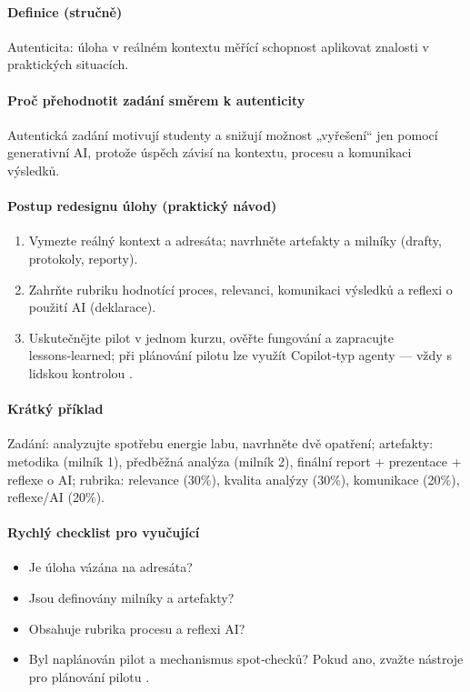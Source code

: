 \paragraph{Definice (stručně)} 
Autenticita: úloha v reálném kontextu měřící schopnost aplikovat znalosti v praktických situacích.

\paragraph{Proč přehodnotit zadání směrem k autenticity}
Autentická zadání motivují studenty a snižují možnost „vyřešení“ jen pomocí generativní AI, protože úspěch závisí na kontextu, procesu a komunikaci výsledků.

\paragraph{Postup redesignu úlohy (praktický návod)}
\begin{enumerate}
  \item Vymezte reálný kontext a adresáta; navrhněte artefakty a milníky (drafty, protokoly, reporty).
  \item Zahrňte rubriku hodnotící proces, relevanci, komunikaci výsledků a reflexi o použití AI (deklarace).
  \item Uskutečnějte pilot v jednom kurzu, ověřte fungování a zapracujte lessons‑learned; při plánování pilotu lze využít Copilot‑typ agenty — vždy s lidskou kontrolou \cite{kb_ai_101_tipu_pdf_04e4a115_page_48_1}.
\end{enumerate}

\paragraph{Krátký příklad} Zadání: analyzujte spotřebu energie labu, navrhněte dvě opatření; artefakty: metodika (milník 1), předběžná analýza (milník 2), finální report + prezentace + reflexe o AI; rubrika: relevance (30\%), kvalita analýzy (30\%), komunikace (20\%), reflexe/AI (20\%).

\paragraph{Rychlý checklist pro vyučující}
\begin{itemize}
  \item Je úloha vázána na adresáta? \item Jsou definovány milníky a artefakty? \item Obsahuje rubrika procesu a reflexi AI? \item Byl naplánován pilot a mechanismus spot‑checků? Pokud ano, zvažte nástroje pro plánování pilotu \cite{kb_ai_101_tipu_pdf_04e4a115_page_48_1}.
\end{itemize}